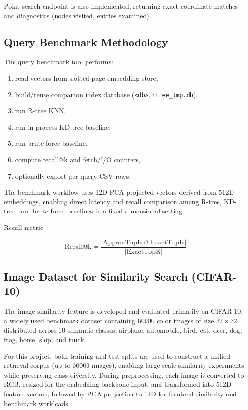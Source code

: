 \documentclass[11pt,a4paper]{article}
\begin{document}
Point-search endpoint is also implemented, returning exact coordinate matches and diagnostics (nodes visited, entries examined).

\subsection{Query Benchmark Methodology}

The query benchmark tool performs:

\begin{enumerate}[leftmargin=1.7em]
  \item read vectors from slotted-page embedding store,
  \item build/reuse companion index database (\texttt{<db>.rtree\_tmp.db}),
  \item run R-tree KNN,
  \item run in-process KD-tree baseline,
  \item run brute-force baseline,
  \item compute recall@k and fetch/I/O counters,
  \item optionally export per-query CSV rows.
\end{enumerate}

The benchmark workflow uses 12D PCA-projected vectors derived from 512D embeddings, enabling direct latency and recall comparison among R-tree, KD-tree, and brute-force baselines in a fixed-dimensional setting.

Recall metric:

\[
\text{Recall@k} = \frac{|\text{ApproxTopK} \cap \text{ExactTopK}|}{|\text{ExactTopK}|}
\]

\subsection{Image Dataset for Similarity Search (CIFAR-10)}

The image-similarity feature is developed and evaluated primarily on CIFAR-10, a widely used benchmark dataset containing 60000 color images of size $32 \times 32$ distributed across 10 semantic classes: airplane, automobile, bird, cat, deer, dog, frog, horse, ship, and truck.

For this project, both training and test splits are used to construct a unified retrieval corpus (up to 60000 images), enabling large-scale similarity experiments while preserving class diversity. During preprocessing, each image is converted to RGB, resized for the embedding backbone input, and transformed into 512D feature vectors, followed by PCA projection to 12D for frontend similarity and benchmark workloads.
\end{document}
